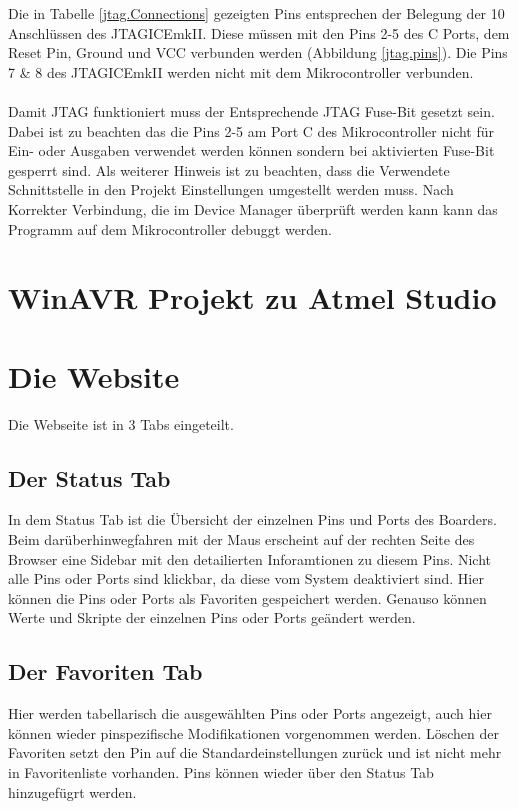Die in Tabelle \ref{jtag.Connections} gezeigten Pins entsprechen der Belegung
der 10 Anschlüssen des JTAGICEmkII. Diese müssen mit den Pins 2-5 des C Ports, dem
Reset Pin, Ground und VCC verbunden werden (Abbildung \ref{jtag.pins}). Die Pins 7 \& 8
des JTAGICEmkII werden nicht mit dem Mikrocontroller verbunden.\\
\\
Damit \ac{JTAG} funktioniert muss der Entsprechende JTAG Fuse-Bit gesetzt sein.
Dabei ist zu beachten das die Pins 2-5 am Port C des Mikrocontroller nicht für
Ein- oder Ausgaben verwendet werden können sondern bei aktivierten Fuse-Bit
gesperrt sind. Als weiterer Hinweis ist zu beachten, dass die Verwendete
Schnittstelle in den Projekt Einstellungen umgestellt werden muss. Nach
Korrekter Verbindung, die im Device Manager überprüft werden kann kann das
Programm auf dem Mikrocontroller debuggt werden.

\section{WinAVR Projekt zu Atmel Studio}


\section{Die Website}

Die Webseite ist in 3 Tabs eingeteilt. 

\subsection{Der Status Tab}
In dem Status Tab ist die Übersicht der
einzelnen Pins und Ports des Boarders. Beim darüberhinwegfahren mit der
Maus erscheint auf der rechten Seite des Browser eine Sidebar mit den
detailierten Inforamtionen zu diesem Pins. Nicht alle Pins oder Ports sind
klickbar, da diese vom System deaktiviert sind. Hier können die Pins oder Ports
als Favoriten gespeichert werden. Genauso können Werte und Skripte der einzelnen
Pins oder Ports geändert werden.

\subsection{Der Favoriten Tab}
Hier werden tabellarisch die ausgewählten Pins oder Ports angezeigt, auch hier
können wieder pinspezifische Modifikationen vorgenommen werden. Löschen der
Favoriten setzt den Pin auf die Standardeinstellungen zurück und ist nicht mehr
in Favoritenliste vorhanden. Pins können wieder über den Status Tab hinzugefügrt
werden.


